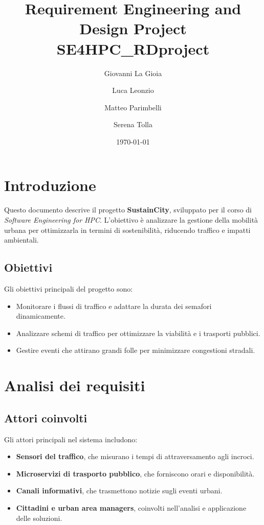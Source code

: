 \documentclass[a4paper,12pt]{article}
\title{Requirement Engineering and Design Project \\ SE4HPC_RDproject}
\author[1]{Giovanni La Gioia}
\author[2]{Luca Leonzio}
\author[3]{Matteo Parimbelli}
\author[4]{Serena Tolla}
\affil[1,2,3]{Politecnico di Milano}
\date{\today}
\begin{document}
\maketitle
\tableofcontents
\newpage

\section{Introduzione}
Questo documento descrive il progetto \textbf{SustainCity}, sviluppato per il corso di \textit{Software Engineering for HPC}. 
L'obiettivo è analizzare la gestione della mobilità urbana per ottimizzarla in termini di sostenibilità, riducendo traffico e impatti ambientali.

\subsection{Obiettivi}
Gli obiettivi principali del progetto sono:
\begin{itemize}
    \item Monitorare i flussi di traffico e adattare la durata dei semafori dinamicamente.
    \item Analizzare schemi di traffico per ottimizzare la viabilità e i trasporti pubblici.
    \item Gestire eventi che attirano grandi folle per minimizzare congestioni stradali.
\end{itemize}

\newpage

\section{Analisi dei requisiti}
\subsection{Attori coinvolti}
Gli attori principali nel sistema includono:
\begin{itemize}
    \item \textbf{Sensori del traffico}, che misurano i tempi di attraversamento agli incroci.
    \item \textbf{Microservizi di trasporto pubblico}, che forniscono orari e disponibilità.
    \item \textbf{Canali informativi}, che trasmettono notizie sugli eventi urbani.
    \item \textbf{Cittadini e urban area managers}, coinvolti nell'analisi e applicazione delle soluzioni.
\end{itemize}
\end{document}
